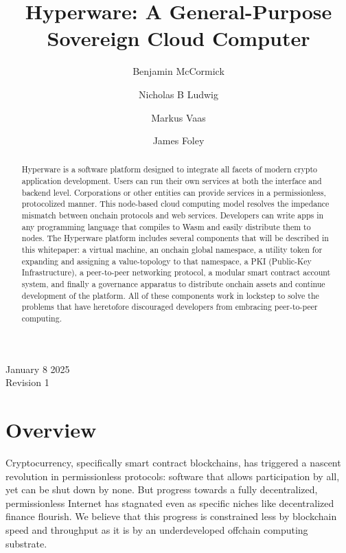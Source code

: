 \documentclass[runningheads]{llncs}
\begin{document}
%
\title{Hyperware: A General-Purpose Sovereign Cloud Computer}
%
%
\author{
Benjamin McCormick \and
Nicholas B Ludwig \and
Markus Vaas \and
James Foley
}
%
\maketitle %
%
\begin{abstract}
Hyperware is a software platform designed to integrate all facets of modern crypto application development.
Users can run their own services at both the interface and backend level.
Corporations or other entities can provide services in a permissionless, protocolized manner.
This node-based cloud computing model resolves the impedance mismatch between onchain protocols and web services.
Developers can write apps in any programming language that compiles to Wasm and easily distribute them to nodes.
The Hyperware platform includes several components that will be described in this whitepaper: a virtual machine, an onchain global namespace, a utility token for expanding and assigning a value-topology to that namespace, a PKI (Public-Key Infrastructure), a peer-to-peer networking protocol, a modular smart contract account system, and finally a governance apparatus to distribute onchain assets and continue development of the platform.
All of these components work in lockstep to solve the problems that have heretofore discouraged developers from embracing peer-to-peer computing.
\end{abstract}
\vspace*{\fill}
\begin{center}
January 8 2025\\
Revision 1
\end{center}
%
\tableofcontents
%
%
%
%
\section{Overview}
\label{sec:overview}

Cryptocurrency, specifically smart contract blockchains, has triggered a nascent revolution in permissionless protocols: software that allows participation by all, yet can be shut down by none.
But progress towards a fully decentralized, permissionless Internet has stagnated even as specific niches like decentralized finance flourish.
We believe that this progress is constrained less by blockchain speed and throughput as it is by an underdeveloped offchain computing substrate.
\end{document}
